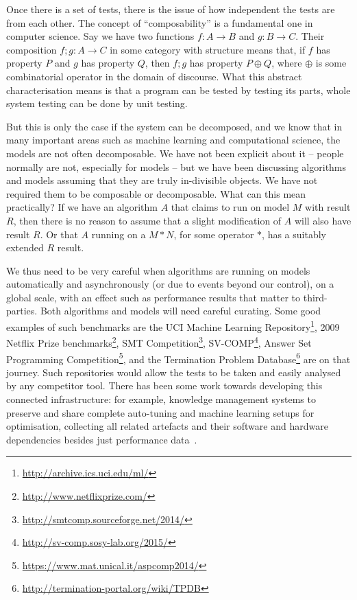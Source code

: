 \documentclass[conference]{IEEEtran}
\begin{document}
Once there is a set of tests, there is the issue of how independent
the tests are from each other.  The concept of ``composability'' is a
fundamental one in computer science.  Say we have two functions $f : A
\rightarrow B$ and $g : B \rightarrow C$. Their composition $f;g
: A \rightarrow C$ in some category with structure means that, if $f$
has property $P$ and $g$ has property $Q$, then $f;g$ has
property $P \oplus Q$, where $\oplus$ is some combinatorial operator
in the domain of discourse. What this abstract characterisation means
is that a program can be tested by testing its parts, whole system
testing can be done by unit testing.

But this is only the case if the system can be decomposed, and we know
that in many important areas such as machine learning and
computational science, the models are not often decomposable.  We have
not been explicit about it -- people normally are not, especially for
models -- but we have been discussing algorithms and models assuming
that they are truly in-divisible objects. We have not required them to
be composable or decomposable. What can this mean practically? If we
have an algorithm $A$ that claims to run on model $M$ with result $R$,
then there is no reason to assume that a slight modification of $A$
will also have result $R$. Or that $A$ running on a $M * N$, for some
operator $*$, has a suitably extended $R$ result.

We thus need to be very careful when algorithms are running on models
automatically and asynchronously (or due to events beyond our
control), on a global scale, with an effect such as performance
results that matter to third-parties. Both algorithms and models will
need careful curating. Some good examples of such benchmarks are the
UCI Machine Learning
Repository\footnote{\url{http://archive.ics.uci.edu/ml/}}, 2009
Netflix Prize benchmarks\footnote{\url{http://www.netflixprize.com/}},
SMT Competition\footnote{\url{http://smtcomp.sourceforge.net/2014/}},
SV-COMP\footnote{\url{http://sv-comp.sosy-lab.org/2015/}}, Answer Set
Programming
Competition\footnote{\url{https://www.mat.unical.it/aspcomp2014/}},
and the Termination Problem
Database\footnote{\url{http://termination-portal.org/wiki/TPDB}} are
on that journey. Such repositories would allow the tests to be taken
and easily analysed by any competitor tool. There has been some work
towards developing this connected infrastructure: for example,
knowledge management systems to preserve and share complete
auto-tuning and machine learning setups for optimisation, collecting
all related artefacts and their software and hardware dependencies
besides just performance data~\cite{fursin-et-al:2014}.
\end{document}
